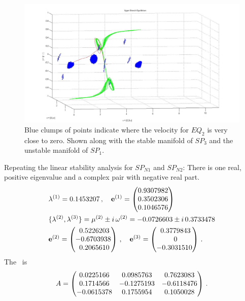 \documentclass[letter,12pt,openany]{article}
\begin{document}
  \begin{center}
\begin{figure}[!h]
\includegraphics[width=1.0\textwidth]{fine_usquare.jpg}
  \caption{
Blue clumps of points indicate where the velocity for $EQ_2$ is very 
close to zero. Shown along with the stable manifold of $SP_3$ and the 
unstable manifold of $SP_1$. 
          }
  \label{fig:fine_usquare}
 \end{figure}
\end{center}

Repeating the linear stability analysis for $SP_{N1}$ and $SP_{N2}$: 
There is one real, positive eigenvalue and a complex pair with negative 
real part. 
  \begin{align} &\eigExp[1] = 0.1453207 \,,\quad \jEigvec[1] =
\begin{pmatrix}
             {0.9307982} \cr
             {0.3502306} \cr
             {0.1046576} \cr
   \end{pmatrix}
   \\
&\{ \eigExp[2],\eigExp[3]\}
  = \eigRe[2] \pm i \,\eigIm[2] =  -0.0726603 \pm i\, 0.3733478
   \nnu\\
&\jEigvec[2] =
\begin{pmatrix}
             {~0.5226203} \cr
             {-0.6703938} \cr
             {~0.2065610} \cr
   \end{pmatrix}
    \,,\quad
\jEigvec[3] =
\begin{pmatrix}
             {~0.3779843} \cr
             {~
             0} \cr
             {- 0.3031510} \cr
   \end{pmatrix}
\,.
\end{align}
The \velgradmat\ is
\[ %
   {\Mvar} =
   \begin{pmatrix}
   {0.0225166} &  {0.0985763} &{0.7623083} \cr
   {0.1714566} &   {-0.1275193} & {-0.6118476} \cr
   {-0.0615378}  &   {0.1755954}  & {0.1050028} \cr
            \end{pmatrix}
\,.
\] %
\end{document}
